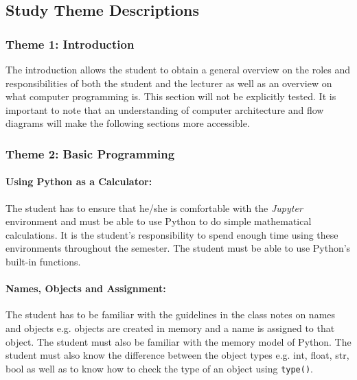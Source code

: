     \subsection{Study Theme Descriptions}
        \subsubsection{Theme 1: Introduction}
            The introduction allows the student to obtain a general overview on
            the roles and responsibilities of both the student and the lecturer
            as well as an overview on what computer programming is. This
            section will not be explicitly tested. It is important to note that
            an understanding of computer architecture and flow diagrams will
            make the following sections more accessible.

        \subsubsection{Theme 2: Basic Programming}
            \paragraph{Using Python as a Calculator:}
                The student has to ensure that he/she is comfortable with the
                \emph{Jupyter} environment and must be able to use Python to do
                simple mathematical calculations. It is the student's
                responsibility to spend enough time using these environments
                throughout the semester. The student must be able to use
                Python's built-in functions.

            \paragraph{Names, Objects and Assignment:}
                The student has to be familiar with the guidelines in the class
                notes on names and objects e.g. objects are created in memory
                and a name is assigned to that object. The student must also be
                familiar with the memory model of Python. The student must also
                know the difference between the object types e.g. int, float,
                str, bool as well as to know how to check the type of an object
                using \texttt{type()}.

